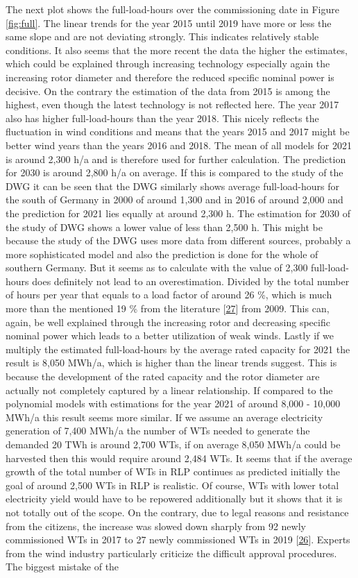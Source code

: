 \documentclass[a4paper,11pt]{article}
\begin{document}
The next plot shows the full-load-hours over the commissioning date in Figure \ref{fig:full}. The linear trends for the year 2015 until 2019 have more or less the same slope and are not deviating strongly. This indicates relatively stable conditions. It also seems that the more recent the data the higher the estimates, which could be explained through increasing technology especially again the increasing rotor diameter and therefore the reduced specific nominal power is decisive. On the contrary the estimation of the data from 2015 is among the highest, even though the latest technology is not reflected here. The year 2017 also has higher full-load-hours than the year 2018. This nicely reflects the fluctuation in wind conditions and means that the years 2015 and 2017 might be better wind years than the years 2016 and 2018. The mean of all models for 2021 is around 2,300 h/a and is therefore used for further calculation. The prediction for 2030 is around 2,800 h/a on average. If this is compared to the study of the DWG it can be seen that the DWG similarly shows average full-load-hours for the south of Germany in 2000 of around 1,300 and in 2016 of around 2,000 and the prediction for 2021 lies equally at around 2,300 h. The estimation for 2030 of the study of DWG shows a lower value of less than 2,500 h. This might be because the study of the DWG uses more data from different sources, probably a more sophisticated model and also the prediction is done for the whole of southern Germany. But it seems as to calculate with the value of 2,300 full-load-hours does definitely not lead to an overestimation. Divided by the total number of hours per year that equals to a load factor of around 26 \%, which is much more than the mentioned 19 \% from the literature {[}\protect\hyperlink{ref-DavidJCMacKay.2009}{27}{]} from 2009. This can, again, be well explained through the increasing rotor and decreasing specific nominal power which leads to a better utilization of weak winds. Lastly if we multiply the estimated full-load-hours by the average rated capacity for 2021 the result is 8,050 MWh/a, which is higher than the linear trends suggest. This is because the development of the rated capacity and the rotor diameter are actually not completely captured by a linear relationship. If compared to the polynomial models with estimations for the year 2021 of around 8,000 - 10,000 MWh/a this result seems more similar. If we assume an average electricity generation of 7,400 MWh/a the number of WTs needed to generate the demanded 20 TWh is around 2,700 WTs, if on average 8,050 MWh/a could be harvested then this would require around 2,484 WTs. It seems that if the average growth of the total number of WTs in RLP continues as predicted initially the goal of around 2,500 WTs in RLP is realistic. Of course, WTs with lower total electricity yield would have to be repowered additionally but it shows that it is not totally out of the scope. On the contrary, due to legal reasons and resistance from the citizens, the increase was slowed down sharply from 92 newly commissioned WTs in 2017 to 27 newly commissioned WTs in 2019 {[}\protect\hyperlink{ref-EnergieagenturRheinlandPfalz.2019}{26}{]}. Experts from the wind industry particularly criticize the difficult approval procedures. The biggest mistake of the 
\end{document}
